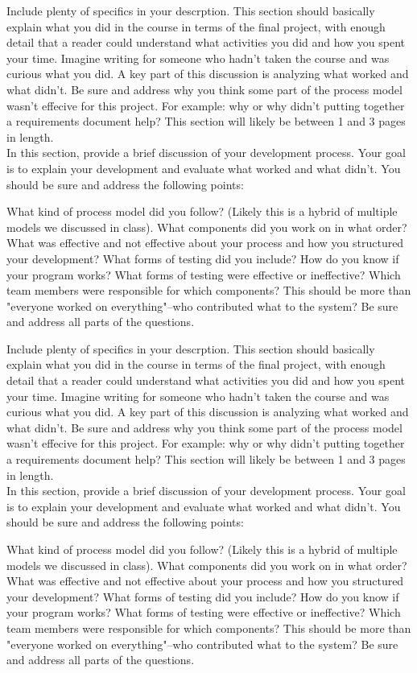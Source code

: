 \documentclass[12pt]{article}
\begin{document}
Include plenty of specifics in your descrption. This section should basically explain what you did in the course in terms of the final project, with enough detail that a reader could understand what activities you did and how you spent your time. Imagine writing for someone who hadn't taken the course and was curious what you did.
A key part of this discussion is analyzing what worked and what didn't. Be sure and address why you think some part of the process model wasn't effecive for this project. For example: why or why didn't putting together a requirements document help?
This section will likely be between 1 and 3 pages in length.\\ 

In this section, provide a brief discussion of your development process. Your goal is to explain your development and evaluate what worked and what didn't. You should be sure and address the following points:

What kind of process model did you follow? (Likely this is a hybrid of multiple models we discussed in class). What components did you work on in what order? What was effective and not effective about your process and how you structured your development?
What forms of testing did you include? How do you know if your program works? What forms of testing were effective or ineffective?
Which team members were responsible for which components? This should be more than "everyone worked on everything"--who contributed what to the system?
Be sure and address all parts of the questions.

Include plenty of specifics in your descrption. This section should basically explain what you did in the course in terms of the final project, with enough detail that a reader could understand what activities you did and how you spent your time. Imagine writing for someone who hadn't taken the course and was curious what you did.
A key part of this discussion is analyzing what worked and what didn't. Be sure and address why you think some part of the process model wasn't effecive for this project. For example: why or why didn't putting together a requirements document help?
This section will likely be between 1 and 3 pages in length.\\ 

In this section, provide a brief discussion of your development process. Your goal is to explain your development and evaluate what worked and what didn't. You should be sure and address the following points:

What kind of process model did you follow? (Likely this is a hybrid of multiple models we discussed in class). What components did you work on in what order? What was effective and not effective about your process and how you structured your development?
What forms of testing did you include? How do you know if your program works? What forms of testing were effective or ineffective?
Which team members were responsible for which components? This should be more than "everyone worked on everything"--who contributed what to the system?
Be sure and address all parts of the questions.
\end{document}
